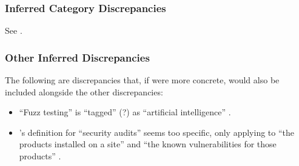     \subsubsection{Inferred Category Discrepancies}
    See .

    

    \subsubsection{Other Inferred Discrepancies}
    The following are discrepancies that, if were more concrete, would also be
    included alongside the other discrepancies:
    \begin{itemize}
        \item ``Fuzz testing'' is ``tagged'' (?) as ``artificial
              intelligence'' \citep[p.~5]{IEEE2022}.
        \item \citeauthor{Gerrard2000b}'s definition for ``security
              audits'' seems too specific, only applying to ``the products
              installed on a site'' and ``the known vulnerabilities for
              those products'' \citeyearpar[p.~28]{Gerrard2000b}.
    \end{itemize}
\fi